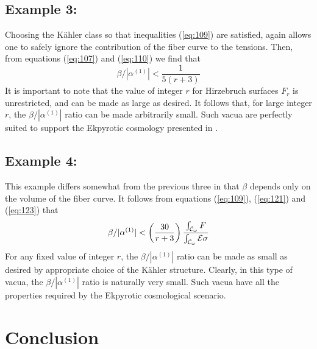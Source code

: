 \documentclass[a4paper,12pt]{article}
\numberwithin{equation}{section}
\theoremstyle{plain}
\begin{document}
\subsection*{Example 3:}

Choosing the K\"{a}hler class so that inequalities (\ref{eq:109}) are satisfied,
again allows one to safely ignore the contribution of the fiber curve to the
tensions. Then, from equations (\ref{eq:107}) and (\ref{eq:110}) we find that
%
\begin{equation}
\beta/|\alpha^{(1)}| < \frac{1}{5(r+3)}
\label{eq:129}
\end{equation}
%
It is important to note that the value of integer $r$ for Hirzebruch surfaces
$F_{r}$ is unrestricted, and can be made as large as desired. It follows that,
for large integer $r$, the $\beta/|\alpha^{(1)}|$ ratio can be made arbitrarily 
small.  Such vacua are perfectly suited to support the Ekpyrotic cosmology
presented in \cite{EU}.

\subsection*{Example 4:}

This example differs somewhat from the previous three in that $\beta$ depends
only on the volume of the fiber curve. It follows from equations (\ref{eq:109}),
(\ref{eq:121}) and (\ref{eq:123}) that
%
\begin{equation}
\beta/|\alpha^{(1)}| < \left(\frac{30}{r+3}\right) \frac{\int_{{\cal{C}}_{\omega}}{F}}
{\int_{{\cal{C}}_{\omega}}{{\cal{E}}\sigma}}
\label{eq:130}
\end{equation}
%
For any fixed value of integer $r$, the $\beta/|\alpha^{(1)}|$ 
ratio can be made as small as desired by appropriate choice of the K\"{a}hler
structure. Clearly, in this type of vacua, the $\beta/|\alpha^{(1)}|$ ratio 
is naturally very small. Such vacua have all the properties required by 
the Ekpyrotic cosmological scenario.

\section{Conclusion}
\end{document}
